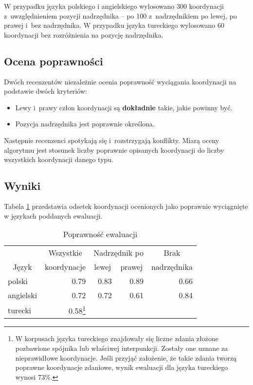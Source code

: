 W przypadku języka polskiego i angielskiego wylosowano 300 koordynacji z~uwzględnieniem pozycji nadrzędnika -- po 100 z~nadrzędnikiem po lewej, po prawej i~bez nadrzędnika. W przypadku języka tureckiego wylosowano 60 koordynacji bez rozróżnienia na pozycję nadrzędnika.

\subsection{Ocena poprawności}

Dwóch recenzentów niezależnie ocenia poprawność wyciągania koordynacji na podstawie dwóch kryteriów:

\begin{itemize}
\item Lewy i~prawy człon koordynacji są \textbf{dokładnie} takie, jakie powinny być.
\item Pozycja nadrzędnika jest poprawnie określona.
\end{itemize}

Następnie recenzenci spotykają się i~rozstrzygają konflikty. Miarą oceny algorytmu jest stosunek liczby poprawnie opisanych koordynacji do liczby wszystkich koordynacji danego typu.

\subsection{Wyniki}

Tabela \ref{tab:ewal} przedstawia odsetek koordynacji ocenionych jako poprawnie wyciągnięte w językach poddanych ewaluacji. 

\begin{table}[H]
\centering
\begin{tabular}{lrrrr}
\toprule
& \multicolumn{1}{c}{Wszystkie}	& \multicolumn{2}{c}{Nadrzędnik po} 	& \multicolumn{1}{c}{Brak} \\
\multicolumn{1}{c}{Język}	& \multicolumn{1}{c}{koordynacje}	
& \multicolumn{1}{c}{lewej}			& \multicolumn{1}{c}{prawej}	& \multicolumn{1}{c}{nadrzędnika} \\
\midrule
polski		& 0.79 & 0.83 & 0.89 & 0.66 \\
angielski	& 0.72 & 0.72 & 0.61 & 0.84 \\
turecki		& 0.58\footnote{W korpusach języka tureckiego znajdowały się liczne zdania złożone pozbawione spójnika lub właściwej interpunkcji. Zostały one uznane za nieprawidłowe koordynacje. Jeśli przyjąć założenie,  że takie zdania tworzą poprawne koordynacje zdaniowe, wynik ewaluacji dla języka tureckiego wynosi 73\%.} &  &  &  \\
\bottomrule
\end{tabular}
\caption{Poprawność ewaluacji}
\label{tab:ewal}
\end{table}

